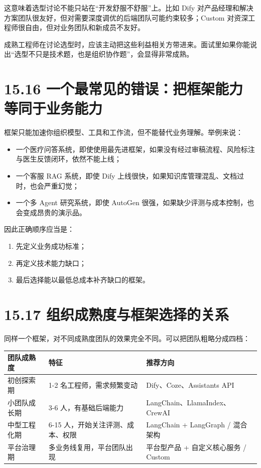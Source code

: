这意味着选型讨论不能只站在``开发舒服不舒服''上。比如 Dify 对产品经理和解决方案团队很友好，但对需要深度调优的后端团队可能约束较多；Custom 对资深工程师很自由，但对业务团队和新成员不友好。


成熟工程师在讨论选型时，应该主动把这些利益相关方带进来。面试里如果你能说出``选型不只是技术题，也是组织协作题''，会显得非常成熟。


\section{15.16 一个最常见的错误：把框架能力等同于业务能力}

框架只能加速你组织模型、工具和工作流，但不能替代业务理解。举例来说：


\begin{itemize}[leftmargin=2em]
\item 一个医疗问答系统，即使使用最先进框架，如果没有经过审稿流程、风险标注与医生反馈闭环，依然不能上线；
\item 一个客服 RAG 系统，即使 Dify 上线很快，如果知识库管理混乱、文档过时，也会严重幻觉；
\item 一个多 Agent 研究系统，即使 AutoGen 很强，如果缺少评测与成本控制，也会变成昂贵的演示品。
\end{itemize}

因此正确顺序应当是：


\begin{enumerate}[leftmargin=2em]
\item 先定义业务成功标准；
\item 再定义技术能力缺口；
\item 最后选择能以最低总成本补齐缺口的框架。
\end{enumerate}

\section{15.17 组织成熟度与框架选择的关系}

同样一个框架，对不同成熟度团队的效果完全不同。可以把团队粗略分成四档：


\begingroup
\scriptsize
\setlength{\tabcolsep}{3pt}
\begin{longtable}{|p{}|p{}|p{}|}
\hline
团队成熟度 & 特征 & 推荐方向 \\ \hline
初创探索期 & 1-2 名工程师，需求频繁变动 & Dify、Coze、Assistants API \\ \hline
小团队成长期 & 3-6 人，有基础后端能力 & LangChain、LlamaIndex、CrewAI \\ \hline
中型工程化期 & 6-15 人，开始关注评测、成本、权限 & LangChain + LangGraph / 混合架构 \\ \hline
平台治理期 & 多业务线复用，平台团队出现 & 平台型产品 + 自定义核心服务 / Custom \\ \hline
\end{longtable}
\endgroup

